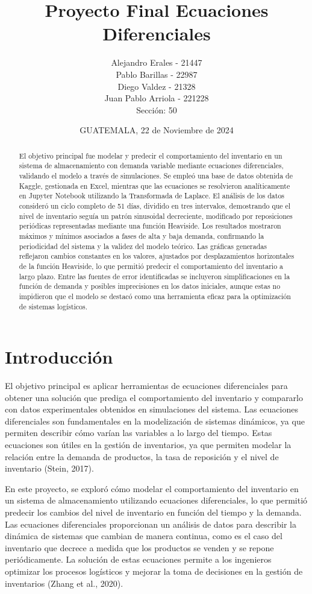 \documentclass[12pt]{article}
\title{Proyecto Final Ecuaciones Diferenciales}
\author{
Alejandro Erales - 21447 \\
Pablo Barillas - 22987 \\
Diego Valdez - 21328 \\
Juan Pablo Arriola - 221228 \\
Sección: 50
}
\date{GUATEMALA, 22 de Noviembre de 2024}
\begin{document}
\maketitle

\begin{abstract}
El objetivo principal fue modelar y predecir el comportamiento del inventario en un sistema de almacenamiento con demanda variable mediante ecuaciones diferenciales, validando el modelo a través de simulaciones. Se empleó una base de datos obtenida de Kaggle, gestionada en Excel, mientras que las ecuaciones se resolvieron analíticamente en Jupyter Notebook utilizando la Transformada de Laplace. El análisis de los datos consideró un ciclo completo de 51 días, dividido en tres intervalos, demostrando que el nivel de inventario seguía un patrón sinusoidal decreciente, modificado por reposiciones periódicas representadas mediante una función Heaviside. Los resultados mostraron máximos y mínimos asociados a fases de alta y baja demanda, confirmando la periodicidad del sistema y la validez del modelo teórico. Las gráficas generadas reflejaron cambios constantes en los valores, ajustados por desplazamientos horizontales de la función Heaviside, lo que permitió predecir el comportamiento del inventario a largo plazo. Entre las fuentes de error identificadas se incluyeron simplificaciones en la función de demanda y posibles imprecisiones en los datos iniciales, aunque estas no impidieron que el modelo se destacó como una herramienta eficaz para la optimización de sistemas logísticos.
\end{abstract}

\section*{Introducción}
El objetivo principal es aplicar herramientas de ecuaciones diferenciales para obtener una solución que prediga el comportamiento del inventario y compararlo con datos experimentales obtenidos en simulaciones del sistema. Las ecuaciones diferenciales son fundamentales en la modelización de sistemas dinámicos, ya que permiten describir cómo varían las variables a lo largo del tiempo. Estas ecuaciones son útiles en la gestión de inventarios, ya que permiten modelar la relación entre la demanda de productos, la tasa de reposición y el nivel de inventario (Stein, 2017).

En este proyecto, se exploró cómo modelar el comportamiento del inventario en un sistema de almacenamiento utilizando ecuaciones diferenciales, lo que permitió predecir los cambios del nivel de inventario en función del tiempo y la demanda. Las ecuaciones diferenciales proporcionan un análisis de datos para describir la dinámica de sistemas que cambian de manera continua, como es el caso del inventario que decrece a medida que los productos se venden y se repone periódicamente. La solución de estas ecuaciones permite a los ingenieros optimizar los procesos logísticos y mejorar la toma de decisiones en la gestión de inventarios (Zhang et al., 2020).
\end{document}
